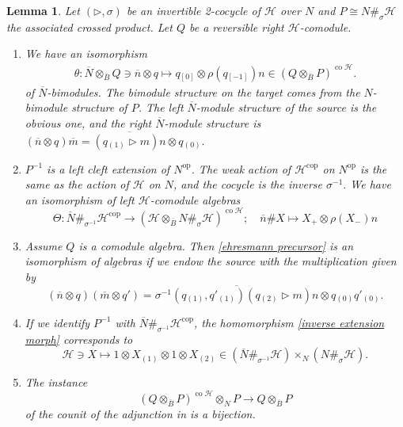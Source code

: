 \documentclass[a4paper,reqno]{amsart}
\numberwithin{equation}{section}
\theoremstyle{plain}
\newtheorem{lem}[thm]{Lemma}
\theoremstyle{remark}
\numberwithin{equation}{section}
\newcommand\inv{^{-1}}
\newcommand{\ot}{\otimes}
\newcommand\ol{\overline}
\newcommand{\z}{{}_{\scriptscriptstyle{(0)}}}
\newcommand{\rz}{{}_{\scriptscriptstyle{[0]}}}
\renewcommand{\o}{{}_{\scriptscriptstyle{(1)}}}
\newcommand{\rmo}{{}_{\scriptscriptstyle{[-1]}}}
\renewcommand{\t}{{}_{\scriptscriptstyle{(2)}}}
\newcommand\ou[1]{\otimes_{#1}}
\newcommand{\la}{{\triangleright}}
\newcommand{\CH}{\mathcal{H}}
\newcommand{\op}{{\operatorname{op}}}
\newcommand\co{{\operatorname{co}}}
\newcommand\cop{{\operatorname{cop}}}
\newcommand\lcp{\#}%
\begin{document}
\begin{lem}\label{calculating inverse part one}
    Let $(\la,\sigma)$ be an invertible 2-cocycle of $\CH$ over $N$ and $P\cong N\#_\sigma\CH$ the associated crossed product. Let $Q$ be a  reversible right $\CH$-comodule.
    \begin{enumerate}
        \item We have an isomorphism 
        \begin{align}\label{ehresmann precursor}
    \theta\colon \ol N\ou{\ol B} Q\ni \overline{n}\ot q\mapsto q\rz\ot \rho(q\rmo)n\in (Q\ou {\ol B}P)^{\co\CH}. 
    \end{align} of $\ol N$-bimodules. The bimodule structure on the target comes from the $N$-bimodule structure of $P$. The left $\ol N$-module structure of the source is the obvious one, and the right $\ol N$-module structure is $(\ol n\ot q)\ol m=\ol{(q\o\la m)n}\ot q\z.$

        \item $P\inv$ is a left cleft extension of $N^\op$. The weak action of $\CH^\cop$ on $N^\op$ is the same as the action of $\CH$ on $N$, and the cocycle is the inverse $\sigma\inv.$ We have an isomorphism of left $\CH$-comodule algebras
        \[\Theta\colon \ol N\lcp_{\sigma\inv}\CH^{\cop}\to (\CH\ou{\ol B}N\#_\sigma\CH)^{\co\CH};\quad \ol n\lcp X\mapsto X_+\ot \rho(X_-)n\]
        \item Assume $Q$ is a comodule algebra. Then \eqref{ehresmann precursor} is an isomorphism of algebras if we endow the source with the multiplication given by
        \[(\ol n\ot q)(\ol m\ot q')=\ol{\sigma\inv(q\o,q'\o)(q\t\la m)n}\ot q\z q'\z.\]
  
        \item If we identify $P\inv$ with $\ol N\#_{\sigma\inv}\CH^{\cop}$, the homomorphism \eqref{inverse extension morph} corresponds to
        \[\CH\ni X\mapsto 1\ot X\o\ot 1\ot X\t\in (\ol N\#_{\sigma\inv}\CH)\times_N(N\#_\sigma\CH).\]  
      \item The instance 
     \[(Q\ou{\ol B}P)^{\co\CH}\ou N P\to Q\ou{\ol B}P\]
     of the counit of the adjunction in  is a bijection.
\end{enumerate}
\end{lem}
\end{document}
